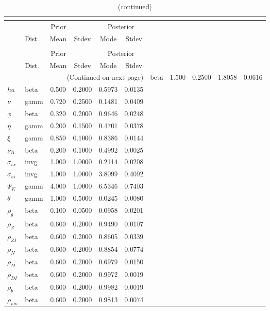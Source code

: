  
\begin{center}
\begin{longtable}{llcccc} 
\caption{Results from posterior maximization (parameters)}\\
 \label{Table:Posterior:1}\\
\toprule 
  & \multicolumn{3}{c}{Prior}  &  \multicolumn{2}{c}{Posterior} \\
  \cmidrule(r{.75em}){2-4} \cmidrule(r{.75em}){5-6}
  & Dist. & Mean  & Stdev & Mode & Stdev \\ 
\midrule \endfirsthead 
\caption{(continued)}\\
 \bottomrule 
  & \multicolumn{3}{c}{Prior}  &  \multicolumn{2}{c}{Posterior} \\
  \cmidrule(r{.75em}){2-4} \cmidrule(r{.75em}){5-6}
  & Dist. & Mean  & Stdev & Mode & Stdev \\ 
\midrule \endhead 
\bottomrule \multicolumn{6}{r}{(Continued on next page)}\endfoot 
\bottomrule\endlastfoot 
${\sigma}$ & beta &   1.500 & 0.2500 &   1.8058 &  0.0616 \\ 
${ha}$ & beta &   0.500 & 0.2000 &   0.5973 &  0.0135 \\ 
$\nu$ & gamm &   0.720 & 0.2500 &   0.1481 &  0.0409 \\ 
${\phi}$ & beta &   0.320 & 0.2000 &   0.9646 &  0.0248 \\ 
${\eta}$ & gamm &   0.200 & 0.1500 &   0.4701 &  0.0378 \\ 
$\xi$ & gamm &   0.850 & 0.1000 &   0.8386 &  0.0144 \\ 
${\nu_R}$ & beta &   0.200 & 0.1000 &   0.4992 &  0.0025 \\ 
${\sigma_{ac}}$ & invg &   1.000 & 1.0000 &   0.2114 &  0.0208 \\ 
${\sigma_{ai}}$ & invg &   1.000 & 1.0000 &   3.8099 &  0.4092 \\ 
${\Psi_{K}}$ & gamm &   4.000 & 1.0000 &   6.5346 &  0.7403 \\ 
${\theta}$ & gamm &   1.000 & 0.5000 &   0.0245 &  0.0080 \\ 
${\rho_g}$ & beta &   0.100 & 0.0500 &   0.0958 &  0.0201 \\ 
${\rho_Z}$ & beta &   0.600 & 0.2000 &   0.9490 &  0.0107 \\ 
${\rho_{ZI}}$ & beta &   0.600 & 0.2000 &   0.8605 &  0.0339 \\ 
${\rho_N}$ & beta &   0.600 & 0.2000 &   0.8854 &  0.0774 \\ 
${\rho_D}$ & beta &   0.600 & 0.2000 &   0.6979 &  0.0150 \\ 
${\rho_{DI}}$ & beta &   0.600 & 0.2000 &   0.9972 &  0.0019 \\ 
${\rho_b}$ & beta &   0.600 & 0.2000 &   0.9982 &  0.0019 \\ 
${\rho_{mu}}$ & beta &   0.600 & 0.2000 &   0.9813 &  0.0074 \\ 
\end{longtable}
 \end{center}
